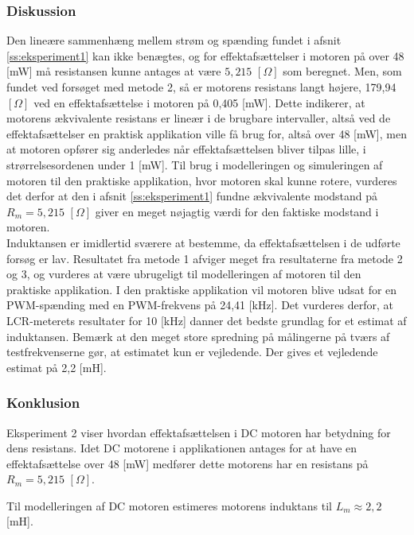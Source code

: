 \subsubsection{Diskussion}
Den lineære sammenhæng mellem strøm og spænding fundet i afsnit \ref{ss:eksperiment1} kan ikke benægtes,
og for effektafsættelser i motoren på over 48 [mW] må resistansen kunne antages at være \(5,215\) \([\Omega]\)  som beregnet.
Men, som fundet ved forsøget med metode 2, så er motorens resistans langt højere,
179,94 \([\Omega]\) ved en effektafsættelse i motoren på 0,405 [mW].
Dette indikerer, at motorens ækvivalente resistans er lineær i de brugbare intervaller, altså ved de effektafsættelser en
praktisk applikation ville få brug for, altså over 48 [mW], men at motoren opfører sig anderledes når effektafsættelsen
bliver tilpas lille, i strørrelsesordenen under 1 [mW].
Til brug i modelleringen og simuleringen af motoren til den praktiske applikation, hvor motoren skal kunne rotere,
vurderes det derfor at den i afsnit \ref{ss:eksperiment1} fundne ækvivalente modstand på \(R_m=5,215\) \([\Omega]\) giver en meget nøjagtig værdi for den faktiske modstand i motoren.\\

Induktansen er imidlertid sværere at bestemme, da effektafsættelsen i de udførte forsøg er lav.
Resultatet fra metode 1 afviger meget fra resultaterne fra metode 2 og 3, og vurderes at være ubrugeligt
til modelleringen af motoren til den praktiske applikation.
I den praktiske applikation vil motoren blive udsat for en PWM-spænding med en PWM-frekvens på 24,41 [kHz].
Det vurderes derfor, at LCR-meterets resultater for 10 [kHz] danner det bedste grundlag for et
estimat af induktansen. Bemærk at den meget store spredning på målingerne på tværs af testfrekvenserne
gør, at estimatet kun er vejledende.
Der gives et vejledende estimat på 2,2 [mH].


\subsubsection{Konklusion}
Eksperiment 2 viser hvordan effektafsættelsen i DC motoren har betydning for dens resistans. Idet DC motorene i applikationen antages for at have en effektafsættelse over 48 [mW] medfører dette motorens har en resistans på \(R_m=5,215\) \([\Omega]\).

Til modelleringen af DC motoren estimeres motorens induktans til \(L_m\approx2,2\) [mH].

